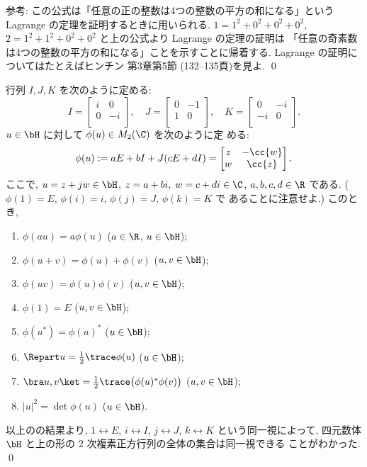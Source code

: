 \documentclass[12pt,twoside]{jarticle}
\begin{document}
\medskip
\noindent
参考: この公式は「任意の正の整数は4つの整数の平方の和になる」という Lagrange 
の定理を証明するときに用いられる.  $1=1^2+0^2+0^2+0^2$, $2=1^2+1^2+0^2+0^2$ 
と上の公式より Lagrange の定理の証明は
「任意の奇素数は4つの整数の平方の和になる」ことを示すことに帰着する.
Lagrange の証明についてはたとえばヒンチン \cite{khinchin} 第3章第5節
(132--135頁)を見よ.
\qed


\begin{question}[四元数体の複素行列表現]
\label{q:H-subset-M2(C)}
  行列 $I,J,K$ を次のように定める:
  \begin{equation*}
    I =
    \begin{bmatrix}
      i &  0 \\
      0 & -i \\
    \end{bmatrix},
    \quad
    J =
    \begin{bmatrix}
      0 & -1 \\
      1 & 0  \\
    \end{bmatrix},
    \quad
    K =
    \begin{bmatrix}
       0 & -i \\
      -i & 0 \\
    \end{bmatrix}.
  \end{equation*}
  $u\in\bH$ に対して $\phi(u)\in M_2(\C)$ を次のように定
  める:
  \begin{equation*}
    \phi(u) := 
    aE + bI + J(cE + dI) =
    \begin{bmatrix}
      z & -\cc{w} \\
      w &  \cc{z} \\
    \end{bmatrix}.
  \end{equation*}
  ここで, $u=z+jw\in\bH$, $z=a+bi,\;w=c+di\in\C$, $a,b,c,d\in\R$ である.
  ($\phi(1)=E$, $\phi(i)=i$, $\phi(j)=J$, $\phi(k)=K$ で
  あることに注意せよ.) このとき, 
  \begin{enumerate}
  \item $\phi(au)=a\phi(u)$ \quad($a\in\R$, $u\in\bH$);
  \item $\phi(u+v)=\phi(u)+\phi(v)$ \quad($u,v\in\bH$);
  \item $\phi(uv)=\phi(u)\phi(v)$ \quad($u,v\in\bH$);
  \item $\phi(1)=E$ \quad($u,v\in\bH$);
  \item $\phi(u^*)=\phi(u)^*$ \quad($u\in\bH$);
  \item $\Repart u = \frac{1}{2}\trace\phi(u)$ \quad($u\in\bH$);
  \item $\bra u,v\ket=\frac{1}{2}\trace\bigr(\phi(u)^*\phi(v)\bigl)$ 
    \quad($u,v\in\bH$);
  \item $|u|^2=\det\phi(u)$ \quad($u\in\bH$).
  \end{enumerate}
  以上のの結果より, $1\leftrightarrow E$, $i\leftrightarrow I$, 
  $j\leftrightarrow J$, $k\leftrightarrow K$ という同一視によって, 
  四元数体 $\bH$ と上の形の $2$ 次複素正方行列の全体の集合は同一視できる
  ことがわかった.
  \qed
\end{question}
\end{document}
